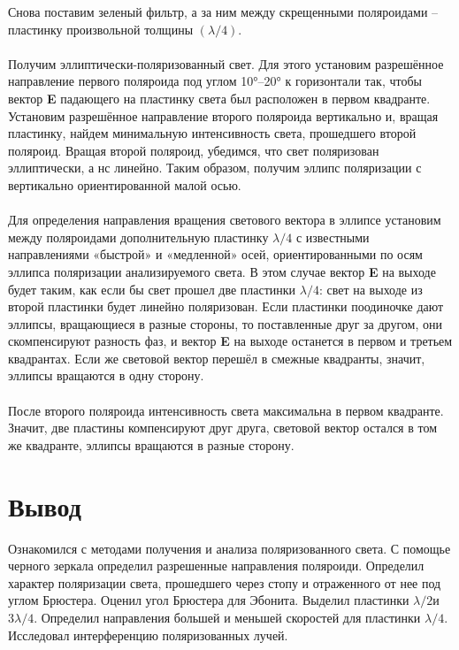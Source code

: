 \documentclass[a4paper]{article}
\begin{document}
Снова поставим зеленый фильтр, а за ним между скрещенными поляроидами -- пластинку произвольной толщины $( \lambda / 4 )$.
\\\\
Получим эллиптически-поляризованный свет. Для этого установим разрешённое направление первого поляроида под углом 10°--20° к горизонтали так, чтобы вектор \textbf{E} падающего на пластинку света был расположен в первом квадранте. Установим разрешённое направление второго поляроида вертикально и, вращая пластинку, найдем минимальную интенсивность света, прошедшего второй поляроид. Вращая второй поляроид, убедимся, что свет поляризован эллиптически, а нс линейно. Таким образом, получим эллипс поляризации с вертикально ориентированной малой осью.
\\\\
Для определения направления вращения светового вектора в эллипсе установим между поляроидами дополнительную пластинку $ \lambda / 4 $ с известными направлениями «быстрой» и «медленной» осей, ориентированными по осям эллипса поляризации анализируемого света. В этом случае вектор \textbf{E} на выходе будет таким, как если бы свет прошел две пластинки $ \lambda / 4 $: свет на выходе из второй пластинки будет линейно поляризован. Если пластинки поодиночке дают эллипсы, вращающиеся в разные стороны, то поставленные друг за другом, они скомпенсируют разность фаз, и вектор \textbf{E} на выходе останется в первом и третьем квадрантах. Если же световой вектор перешёл в смежные квадранты, значит, эллипсы вращаются в одну сторону.
\\\\
После второго поляроида интенсивность света максимальна в первом квадранте. Значит, две пластины компенсируют друг друга, световой вектор остался в том же квадранте, эллипсы вращаются в разные сторону.

\section{Вывод}

Ознакомился с методами получения и анализа поляризованного света. С помощье черного зеркала определил разрешенные направления поляроиди. Определил характер поляризации света, прошедшего через стопу и отраженного от нее под углом Брюстера. Оценил угол Брюстера для Эбонита. Выделил пластинки $  \lambda / 2 $и$ 3 \lambda / 4 $. Определил направления большей и меньшей скоростей для пластинки $ \lambda / 4 $. Исследовал интерференцию поляризованных лучей.
\end{document}
